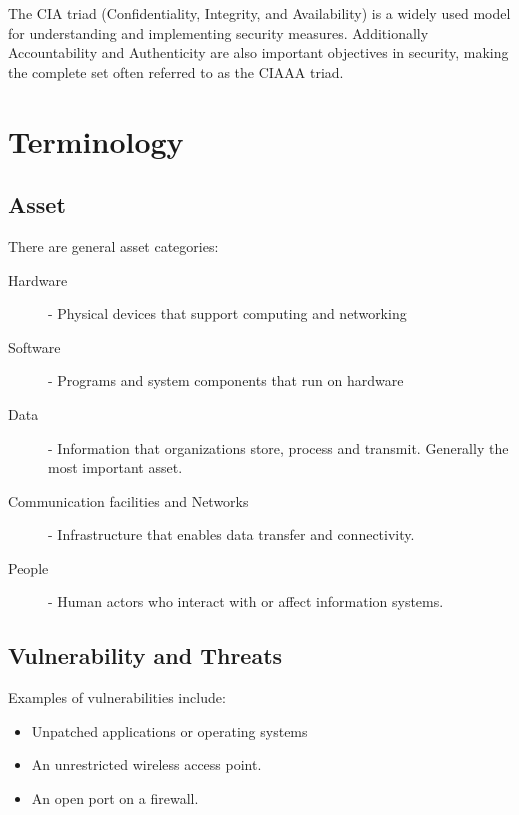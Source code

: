 \documentclass[12pt letter]{report}
\begin{document}
The CIA triad (Confidentiality, Integrity, and Availability) is a
widely used model for understanding and implementing security measures.
Additionally Accountability and Authenticity are also important objectives
in security, making the complete set often referred to as the CIAAA
triad.

\chapter{Terminology}

\section{Asset}

There are general asset categories:
\begin{description}
  \item[Hardware]  - Physical devices that support computing and networking
  \item[Software] - Programs and system components that run on hardware
  \item[Data]- Information that organizations store, process and
    transmit. Generally the most important asset.
  \item[Communication facilities and Networks] - Infrastructure that
    enables data transfer and connectivity.
  \item[People] - Human actors who interact with or affect information systems.
\end{description}

\section{Vulnerability and Threats}

Examples of vulnerabilities include:
\begin{itemize}
  \item Unpatched applications or operating systems
  \item An unrestricted wireless access point.
  \item An open port on a firewall.
\end{itemize}

\end{document}
